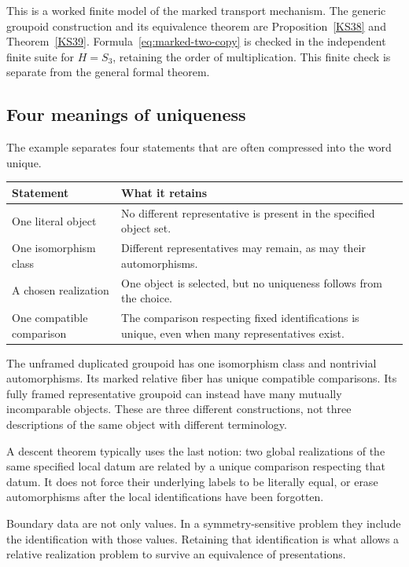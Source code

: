 This is a worked finite model of the marked transport mechanism. The generic groupoid construction and its equivalence theorem are Proposition~\ref{KS38} and Theorem~\ref{KS39}. Formula~\eqref{eq:marked-two-copy} is checked in the independent finite suite for \(H=S_3\), retaining the order of multiplication. This finite check is separate from the general formal theorem.

\subsection{Four meanings of uniqueness}
The example separates four statements that are often compressed into the word unique.
\begin{center}
\begin{tabularx}{\linewidth}{@{}p{.28\linewidth}X@{}}
\toprule
Statement & What it retains\\
\midrule
One literal object & No different representative is present in the specified object set.\\
One isomorphism class & Different representatives may remain, as may their automorphisms.\\
A chosen realization & One object is selected, but no uniqueness follows from the choice.\\
One compatible comparison & The comparison respecting fixed identifications is unique, even when many representatives exist.\\
\bottomrule
\end{tabularx}
\end{center}
The unframed duplicated groupoid has one isomorphism class and nontrivial automorphisms. Its marked relative fiber has unique compatible comparisons. Its fully framed representative groupoid can instead have many mutually incomparable objects. These are three different constructions, not three descriptions of the same object with different terminology.

A descent theorem typically uses the last notion: two global realizations of the same specified local datum are related by a unique comparison respecting that datum. It does not force their underlying labels to be literally equal, or erase automorphisms after the local identifications have been forgotten.

\begin{insight}
Boundary data are not only values. In a symmetry-sensitive problem they include the identification with those values. Retaining that identification is what allows a relative realization problem to survive an equivalence of presentations.
\end{insight}
